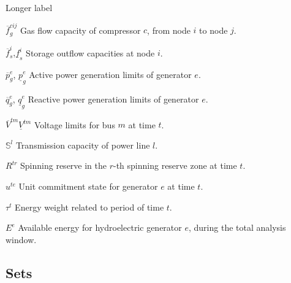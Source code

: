 \begin{labeling}{Longer label\quad}
\item [$\overline{f}^{cij}_{g}$] Gas flow capacity of compressor $c$, from node $i$ to node $j$.
\item [$\overline{f}^{i}_{s}$,$\underline{f}^{i}_{s}$] Storage outflow capacities at node $i$.
\item [$\overline{p}_{g}^{e}$, $\underline{p}_{g}^{e}$] Active power generation limits of generator $e$.
\item [$\overline{q}_{g}^{e}$, $\underline{q}_{g}^{e}$] Reactive power generation limits of generator $e$.
\item [$\overline{V}^{tm} \underline{V}^{tm}$] Voltage limits for bus $m$ at time $t$.
\item [$\mathbb{S}^{l}$] Transmission capacity of power line $l$.
\item [$R^{tr}$]  Spinning reserve in the $r$-th spinning reserve zone at time $t$.
\item [$u^{te}$] Unit commitment state for generator $e$ at time $t$.
\item [$\tau^{t}$] Energy weight related to period of time $t$.
\item [$E^{e}$] Available energy for hydroelectric generator $e$, \break during the total analysis window.
\end{labeling}

\subsection*{Sets}

